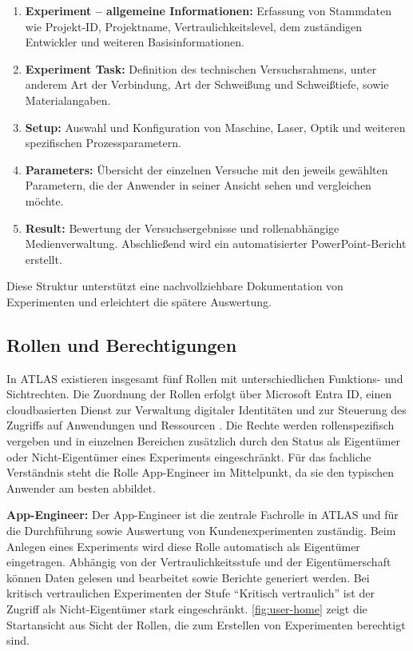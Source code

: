 \begin{enumerate}
	\item \textbf{Experiment -- allgemeine Informationen:} Erfassung von Stammdaten wie Projekt-ID, Projektname, Vertraulichkeitslevel, dem zuständigen Entwickler und weiteren Basisinformationen.
	\item \textbf{Experiment Task:} Definition des technischen Versuchsrahmens, unter anderem Art der Verbindung, Art der Schweißung und Schweißtiefe, sowie Materialangaben.
	\item \textbf{Setup:} Auswahl und Konfiguration von Maschine, Laser, Optik und weiteren spezifischen Prozessparametern.
	\item \textbf{Parameters:} Übersicht der einzelnen Versuche mit den jeweils gewählten Parametern, die der Anwender in seiner Ansicht sehen und vergleichen möchte.
	\item \textbf{Result:} Bewertung der Versuchsergebnisse und rollenabhängige Medienverwaltung. Abschließend wird ein automatisierter PowerPoint-Bericht erstellt.
\end{enumerate}

Diese Struktur unterstützt eine nachvollziehbare Dokumentation von Experimenten und erleichtert die spätere Auswertung.

\subsection{Rollen und Berechtigungen}
\label{sec:rollen-und-berechtigungen}
In \ac{ATLAS} existieren insgesamt fünf Rollen mit unterschiedlichen Funktions- und Sichtrechten. Die Zuordnung der Rollen erfolgt über Microsoft Entra ID, einen cloudbasierten Dienst zur Verwaltung digitaler Identitäten und zur Steuerung des Zugriffs auf Anwendungen und Ressourcen \cite{MicrosoftEntraWhatIs2026}. Die Rechte werden rollenspezifisch vergeben und in einzelnen Bereichen zusätzlich durch den Status als Eigentümer oder Nicht-Eigentümer eines Experiments eingeschränkt. Für das fachliche Verständnis steht die Rolle App-Engineer im Mittelpunkt, da sie den typischen Anwender am besten abbildet.

\textbf{App-Engineer:} Der App-Engineer ist die zentrale Fachrolle in \ac{ATLAS} und für die Durchführung sowie Auswertung von Kundenexperimenten zuständig. Beim Anlegen eines Experiments wird diese Rolle automatisch als Eigentümer eingetragen. Abhängig von der Vertraulichkeitsstufe und der Eigentümerschaft können Daten gelesen und bearbeitet sowie Berichte generiert werden. Bei kritisch vertraulichen Experimenten der Stufe \enquote{Kritisch vertraulich} ist der Zugriff als Nicht-Eigentümer stark eingeschränkt. \autoref{fig:user-home} zeigt die Startansicht aus Sicht der Rollen, die zum Erstellen von Experimenten berechtigt sind.

